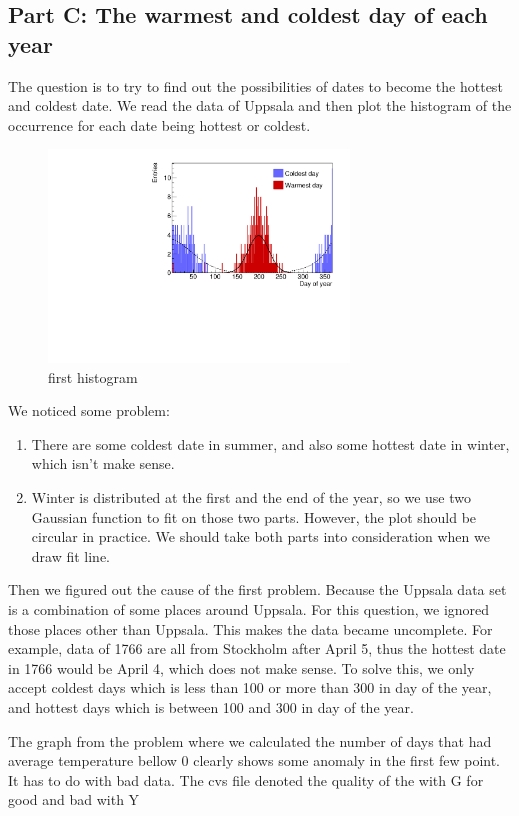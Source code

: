 \documentclass[a4paper]{article}
\begin{document}
\subsection{Part C: The warmest and coldest day of each year}

The question is to try to find out the possibilities of dates to become the hottest and coldest date. We read the data of Uppsala and then plot the histogram of the occurrence for each date being hottest or coldest. 

\begin{figure}[htp]
    \centering
    \includegraphics[width=8cm]{./images/hotCold_Upp_prev}
    \caption{first histogram}
    \label{fig:hist}
\end{figure}

We noticed some problem:
\begin{enumerate}
\item There are some coldest date in summer, and also some hottest date in winter, which isn't make sense.
\item Winter is distributed at the first and the end of the year, so we use two Gaussian function to fit on those two parts. However, the plot should be circular in practice. We should take both parts into consideration when we draw fit line.
\end{enumerate}
Then we figured out the cause of the first problem. Because the Uppsala data set is a combination of some places around Uppsala. For this question, we ignored those places other than Uppsala. This makes the data became uncomplete. For example, data of 1766 are all from Stockholm after April 5, thus the hottest date in 1766 would be April 4, which does not make sense. To solve this, we only accept coldest days which is less than 100 or more than 300 in day of the year, and hottest days which is between 100 and 300 in day of the year.




The graph from the problem where we calculated the number of days that had average temperature bellow 0 clearly shows some anomaly in the first few point. It has to do with bad data. The cvs file denoted the quality of the with G for good and bad with Y 
\end{document}
